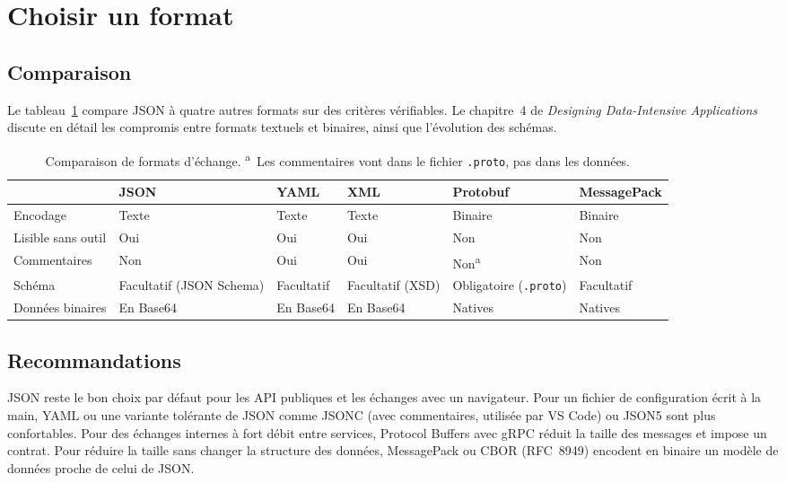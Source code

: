 \documentclass[12pt,a4paper]{article}
\newcommand{\exemple}[3][]{%
  \par\addvspace{6pt}\noindent\begin{minipage}{\linewidth}%
  \end{minipage}\par\addvspace{6pt}}
\begin{document}
\exemple[language=json]{json/probleme.json}{Erreur d'API au format RFC 9457}

\section{Choisir un format}
\label{sec:formats}

\subsection{Comparaison}
Le tableau~\ref{tab:formats} compare JSON à quatre autres formats sur des critères vérifiables. Le chapitre~4 de \textit{Designing Data-Intensive Applications}~\cite{kleppmann2017designing} discute en détail les compromis entre formats textuels et binaires, ainsi que l'évolution des schémas.

\begin{table}[htbp]
\centering
\footnotesize
\begin{tabularx}{\textwidth}{lXXXXX}
\toprule
& \textbf{JSON} & \textbf{YAML} & \textbf{XML} & \textbf{Protobuf} & \textbf{MessagePack} \\
\midrule
Encodage & Texte & Texte & Texte & Binaire & Binaire \\
Lisible sans outil & Oui & Oui & Oui & Non & Non \\
Commentaires & Non & Oui & Oui & Non\textsuperscript{a} & Non \\
Schéma & Facultatif (JSON Schema) & Facultatif & Facultatif (XSD) & Obligatoire (\texttt{.proto}) & Facultatif \\
Données binaires & En Base64 & En Base64 & En Base64 & Natives & Natives \\
\bottomrule
\end{tabularx}
\caption{Comparaison de formats d'échange. \textsuperscript{a}~Les commentaires vont dans le fichier \texttt{.proto}, pas dans les données.}
\label{tab:formats}
\end{table}

\subsection{Recommandations}
JSON reste le bon choix par défaut pour les API publiques et les échanges avec un navigateur. Pour un fichier de configuration écrit à la main, YAML ou une variante tolérante de JSON comme JSONC (avec commentaires, utilisée par VS Code) ou JSON5 sont plus confortables. Pour des échanges internes à fort débit entre services, Protocol Buffers avec gRPC réduit la taille des messages et impose un contrat. Pour réduire la taille sans changer la structure des données, MessagePack ou CBOR (RFC~8949) encodent en binaire un modèle de données proche de celui de JSON.
\end{document}
